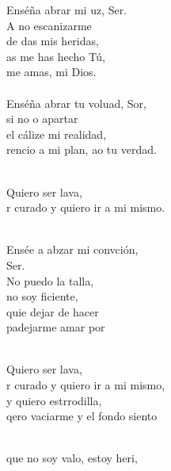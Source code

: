 \begin{cancion}[Resucitados][]%
	Enséña abrar mi uz, Ser. \\
	A no escanizarme \\
	de das mis heridas, \\
	as me has hecho Tú, \\
	 me amas, mi Dios.  \\
\jump\\
	Enséña abrar tu voluad, Sor,  \\
	si no o apartar \\
	el cálize mi realidad, \\
	rencio a mi plan, ao tu verdad. \\\jump\\
	\begin{chorus}%
	Quiero  ser lava, \\
	r curado y quiero ir a mi mismo. \\
	\end{chorus}%
	\jump\\
	Ensée a abzar mi convción, \\
	Ser. \\
	No puedo la talla, \\
	no soy ficiente, \\
	quie dejar de hacer \\
	padejarme amar por  \\\jump\\
	\begin{chorus}%
	Quiero  ser lava, \\
	r curado y quiero ir a mi mismo, \\
	y quiero estrrodilla,  \\
	qero vaciarme y el fondo siento\\
	\end{chorus}%
	\jump\\
	que no soy valo, estoy heri, \\

\end{cancion}
